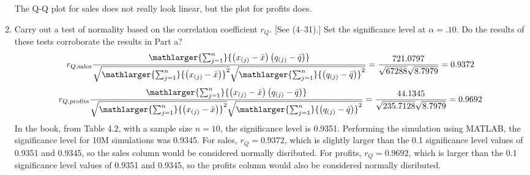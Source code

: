 \begin{enumerate}[label= (\alph*)]
    The Q-Q plot for sales does not really look linear, but the plot for profits does.
    \item Carry out a test of normality based on the correlation coefficient $r_{Q}$. [See (4--31).]
    Set the significance level at $\alpha = .10$. Do the results of these tests corroborate the results in Part a?
    \[
        r_{Q, \text{sales}}
        \frac{\mathlarger{\sum_{j=1}^{n}}{\left(x_{(j)} - \bar{x}\right)\left(q_{(j)} - \bar{q}\right)}}{\sqrt{\mathlarger{\sum_{j=1}^{n}}{\left(x_{(j)} - \bar{x}\right)}^{2}}\sqrt{\mathlarger{\sum_{j=1}^{n}}{\left(q_{(j)} - \bar{q}\right)}^{2}}}
        =
        \frac{721.0797}{\sqrt{67288}\sqrt{8.7979}}
        =
        0.9372
    \]
    \[
        r_{Q, \text{profits}}
        \frac{\mathlarger{\sum_{j=1}^{n}}{\left(x_{(j)} - \bar{x}\right)\left(q_{(j)} - \bar{q}\right)}}{\sqrt{\mathlarger{\sum_{j=1}^{n}}{\left(x_{(j)} - \bar{x}\right)}^{2}}\sqrt{\mathlarger{\sum_{j=1}^{n}}{\left(q_{(j)} - \bar{q}\right)}^{2}}}
        =
        \frac{44.1345}{\sqrt{235.7128}\sqrt{8.7979}}
        =
        0.9692
    \]
    In the book, from Table 4.2, with a sample size $n = 10$, the significance level is 0.9351.
    Performing the simulation using MATLAB, the significance level for 10M simulations was 0.9345.
    For sales, $r_{Q} = 0.9372$, which is slightly larger than the 0.1 significance level values of 0.9351 and 0.9345, so the sales column would be considered normally disributed.
    For profits, $r_{Q} = 0.9692$, which is larger than the 0.1 significance level values of 0.9351 and 0.9345, so the profits column would also be considered normally disributed.
\end{enumerate}
